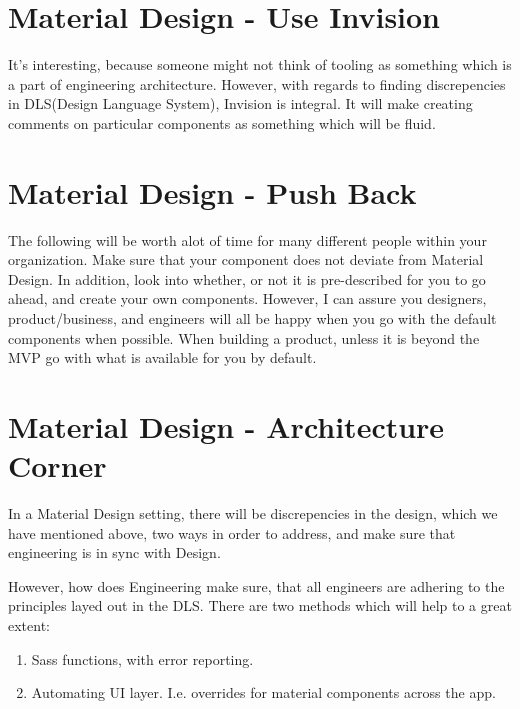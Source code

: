 \section{ Material Design - Use Invision }
It's interesting, because someone might not think of tooling as something which
is a part of engineering architecture. However, with regards to finding
discrepencies in DLS(Design Language System), Invision is integral. It will
make creating comments on particular components as something which will be fluid.

\section{ Material Design - Push Back }
The following will be worth alot of time for many different people within your
organization. Make sure that your component does not deviate from Material
Design. In addition, look into whether, or not it is pre-described for you to
go ahead, and create your own components. However, I can assure you designers,
product/business, and engineers will all be happy when you go with the default
components when possible. When building a product, unless it is beyond the MVP
go with what is available for you by default.

\section{ Material Design - Architecture Corner }
In a Material Design setting, there will be discrepencies in the design, which
we have mentioned above, two ways in order to address, and make sure that
engineering is in sync with Design.

However, how does Engineering make sure, that all engineers are adhering to the
principles layed out in the DLS. There are two methods which will help to a
great extent:
\begin{enumerate}
  \item Sass functions, with error reporting.
  \item Automating UI layer. I.e. overrides for material components across the
  app.
\end{enumerate}
